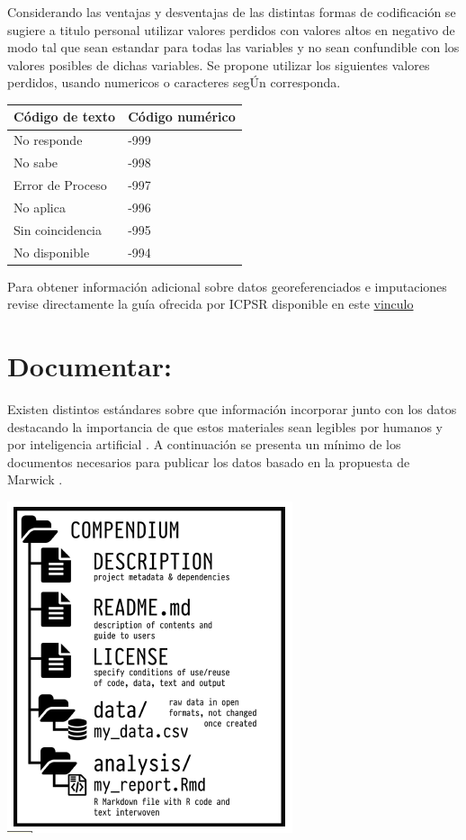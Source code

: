 \documentclass[
  14pt,
]{book}
\begin{document}
Considerando las ventajas y desventajas de las distintas formas de codificación se sugiere a titulo personal utilizar valores perdidos con valores altos en negativo de modo tal que sean estandar para todas las variables y no sean confundible con los valores posibles de dichas variables. Se propone utilizar los siguientes valores perdidos, usando numericos o caracteres segÚn corresponda.

\begin{longtable}[]{@{}ll@{}}
\toprule
Código de texto & Código numérico\tabularnewline
\midrule
\endhead
No responde & -999\tabularnewline
No sabe & -998\tabularnewline
Error de Proceso & -997\tabularnewline
No aplica & -996\tabularnewline
Sin coincidencia & -995\tabularnewline
No disponible & -994\tabularnewline
\bottomrule
\end{longtable}

Para obtener información adicional sobre datos georeferenciados e imputaciones revise directamente la guía ofrecida por ICPSR disponible en este \href{https://www.icpsr.umich.edu/files/deposit/dataprep.pdf}{vinculo}

\hypertarget{documentar}{%
\section{\texorpdfstring{\textbf{Documentar:}}{Documentar:}}\label{documentar}}

Existen distintos estándares sobre que información incorporar junto con los datos destacando la importancia de que estos materiales sean legibles por humanos y por inteligencia artificial \citep{go_fair}. A continuación se presenta un mínimo de los documentos necesarios para publicar los datos basado en la propuesta de Marwick \citep{dandrea_Meetup_2020}.

\begin{center}\includegraphics[width=0.5\linewidth,]{images/small_rc} \end{center}
\end{document}

